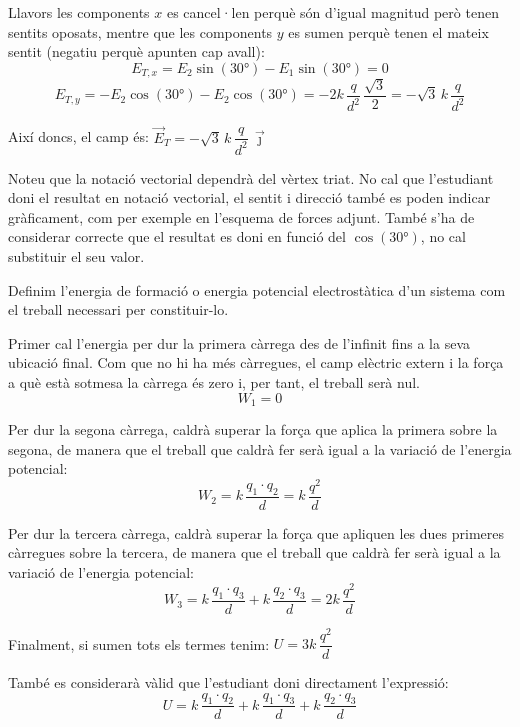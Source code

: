 \begin{solapartat}
Llavors les components $x$ es cancel·len perquè són d'igual magnitud però tenen sentits
oposats, mentre que les components $y$ es sumen perquè tenen el mateix sentit (negatiu
perquè apunten cap avall):
\[ E_{T,x} = E_2\sin(30°) - E_1\sin(30°) = 0 \]
\[ E_{T,y} = -E_2\cos(30°) - E_2\cos(30°) = -2k\,\frac{q}{d^2}\,\frac{\sqrt{3}}{2} = -\sqrt{3}\,k\,\frac{q}{d^2} \]

Així doncs, el camp és: $\vec{E}_T = -\sqrt{3}\,k\,\dfrac{q}{d^2}\,\vec{\jmath}$

Noteu que la notació vectorial dependrà del vèrtex triat. No cal que l'estudiant doni el
resultat en notació vectorial, el sentit i direcció també es poden indicar gràficament,
com per exemple en l'esquema de forces adjunt. També s'ha de considerar correcte que el
resultat es doni en funció del $\cos(30°)$, no cal substituir el seu valor.
\end{solapartat}

\begin{solapartat}
 Definim l'energia de formació o energia potencial electrostàtica d'un
sistema com el treball necessari per constituir-lo.

 Primer cal l'energia per dur la primera càrrega des de l'infinit fins a la
seva ubicació final. Com que no hi ha més càrregues, el camp elèctric extern i la força a
què està sotmesa la càrrega és zero i, per tant, el treball serà nul.
\[ W_1 = 0 \]

 Per dur la segona càrrega, caldrà superar la força que aplica la primera
sobre la segona, de manera que el treball que caldrà fer serà igual a la variació de
l'energia potencial:
\[ W_2 = k\,\frac{q_1\cdot q_2}{d} = k\,\frac{q^2}{d} \]

 Per dur la tercera càrrega, caldrà superar la força que apliquen les dues
primeres càrregues sobre la tercera, de manera que el treball que caldrà fer serà igual a
la variació de l'energia potencial:
\[ W_3 = k\,\frac{q_1\cdot q_3}{d} + k\,\frac{q_2\cdot q_3}{d} = 2k\,\frac{q^2}{d} \]

 Finalment, si sumen tots els termes tenim: $U = 3k\,\dfrac{q^2}{d}$

També es considerarà vàlid que l'estudiant doni directament l'expressió:
\[ U = k\,\frac{q_1\cdot q_2}{d} + k\,\frac{q_1\cdot q_3}{d} + k\,\frac{q_2\cdot q_3}{d} \]
\end{solapartat}
